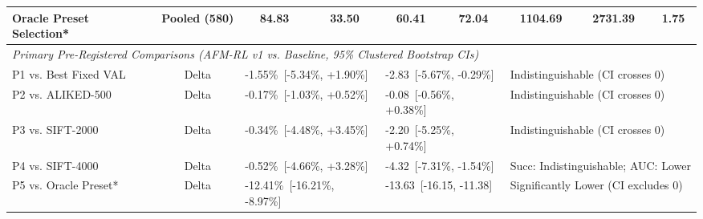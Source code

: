 \begin{table}[t]
\begin{tabular}{lcccccccc}
Oracle Preset Selection* & Pooled (580) & 84.83 & 33.50 & 60.41 & 72.04 & 1104.69 & 2731.39 & 1.75 \\
\hline
\multicolumn{9}{l}{\textit{Primary Pre-Registered Comparisons (AFM-RL v1 vs. Baseline, 95\% Clustered Bootstrap CIs)}} \\
P1 vs. Best Fixed VAL & Delta & \multicolumn{2}{l}{-1.55\%\ [-5.34\%, +1.90\%]} & \multicolumn{2}{l}{-2.83\ [-5.67\%, -0.29\%]} & \multicolumn{3}{l}{Indistinguishable (CI crosses 0)} \\
P2 vs. ALIKED-500 & Delta & \multicolumn{2}{l}{-0.17\%\ [-1.03\%, +0.52\%]} & \multicolumn{2}{l}{-0.08\ [-0.56\%, +0.38\%]} & \multicolumn{3}{l}{Indistinguishable (CI crosses 0)} \\
P3 vs. SIFT-2000 & Delta & \multicolumn{2}{l}{-0.34\%\ [-4.48\%, +3.45\%]} & \multicolumn{2}{l}{-2.20\ [-5.25\%, +0.74\%]} & \multicolumn{3}{l}{Indistinguishable (CI crosses 0)} \\
P4 vs. SIFT-4000 & Delta & \multicolumn{2}{l}{-0.52\%\ [-4.66\%, +3.28\%]} & \multicolumn{2}{l}{-4.32\ [-7.31\%, -1.54\%]} & \multicolumn{3}{l}{Succ: Indistinguishable; AUC: Lower} \\
P5 vs. Oracle Preset* & Delta & \multicolumn{2}{l}{-12.41\%\ [-16.21\%, -8.97\%]} & \multicolumn{2}{l}{-13.63\ [-16.15, -11.38]} & \multicolumn{3}{l}{Significantly Lower (CI excludes 0)} \\
\hline
\end{tabular}
\end{table}
